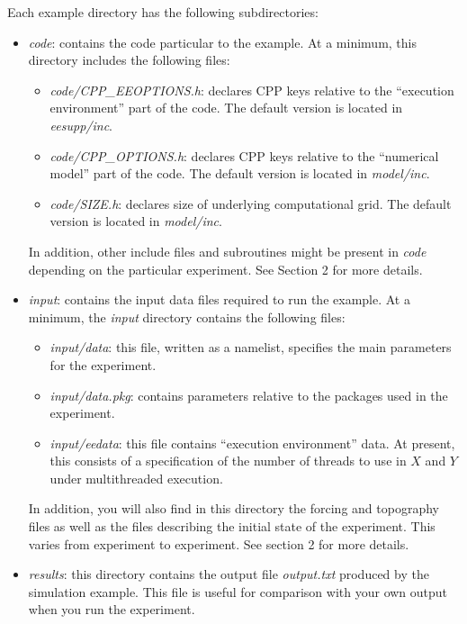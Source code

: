 Each example directory has the following subdirectories:

\begin{itemize}
\item \textit{code}: contains the code particular to the example. At a
  minimum, this directory includes the following files:

  \begin{itemize}
  \item \textit{code/CPP\_EEOPTIONS.h}: declares CPP keys relative to
    the ``execution environment'' part of the code. The default
    version is located in \textit{eesupp/inc}.
  
  \item \textit{code/CPP\_OPTIONS.h}: declares CPP keys relative to
    the ``numerical model'' part of the code. The default version is
    located in \textit{model/inc}.
  
  \item \textit{code/SIZE.h}: declares size of underlying
    computational grid.  The default version is located in
    \textit{model/inc}.
  \end{itemize}
  
  In addition, other include files and subroutines might be present in
  \textit{code} depending on the particular experiment. See Section 2
  for more details.
  
\item \textit{input}: contains the input data files required to run
  the example. At a minimum, the \textit{input} directory contains the
  following files:

  \begin{itemize}
  \item \textit{input/data}: this file, written as a namelist,
    specifies the main parameters for the experiment.
  
  \item \textit{input/data.pkg}: contains parameters relative to the
    packages used in the experiment.
  
  \item \textit{input/eedata}: this file contains ``execution
    environment'' data. At present, this consists of a specification
    of the number of threads to use in $X$ and $Y$ under multithreaded
    execution.
  \end{itemize}

In addition, you will also find in this directory the forcing and
topography files as well as the files describing the initial state of
the experiment.  This varies from experiment to experiment. See
section 2 for more details.

\item \textit{results}: this directory contains the output file
  \textit{output.txt} produced by the simulation example. This file is
  useful for comparison with your own output when you run the
  experiment.
\end{itemize}

